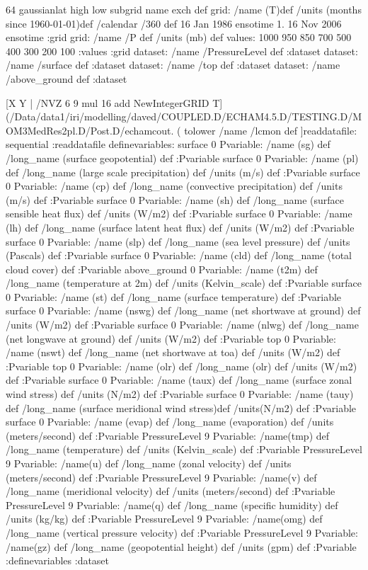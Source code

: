 \begin{ingrid}
64 gaussianlat
    high low subgrid
name exch def
grid:
/name (T)def
/units (months since 1960-01-01)def
/calendar /360 def
16 Jan 1986 ensotime
1.
16 Nov 2006 ensotime
:grid
grid: /name /P def
/units  (mb)  def
values: 1000 950 850 700 500 400 300 200 100
:values
 :grid
dataset:
/name /PressureLevel def
:dataset
dataset:
/name /surface def
:dataset
dataset:
/name /top def
:dataset
dataset:
/name /above_ground def
:dataset

[X
    Y |
    /NVZ 6
      9 mul
      16 add
      NewIntegerGRID
     T] (/Data/data1/iri/modelling/daved/COUPLED.D/ECHAM4.5.D/TESTING.D/MOM3MedRes2pl.D/Post.D/echamcout.%
        (%
        tolower
        /name /lcmon def
        ]readdatafile: sequential :readdatafile
definevariables:
surface 0 Pvariable: /name (sg) def /long_name (surface geopotential) def  :Pvariable
surface 0 Pvariable: /name (pl) def /long_name (large scale precipitation) def /units (m/s) def :Pvariable
surface 0 Pvariable: /name (cp) def /long_name (convective precipitation) def /units (m/s) def :Pvariable
surface 0 Pvariable: /name (sh) def /long_name (surface sensible heat flux) def /units (W/m2) def :Pvariable
surface 0 Pvariable: /name (lh) def /long_name (surface latent heat flux) def /units (W/m2) def :Pvariable
surface 0 Pvariable: /name (slp) def /long_name (sea level pressure) def /units (Pascals) def :Pvariable
surface 0 Pvariable: /name (cld) def /long_name (total cloud cover) def :Pvariable
above_ground 0 Pvariable: /name (t2m) def /long_name (temperature at 2m) def /units (Kelvin_scale) def :Pvariable
surface 0 Pvariable: /name (st) def /long_name (surface temperature) def :Pvariable
surface 0 Pvariable: /name (nswg) def /long_name (net shortwave at ground) def /units (W/m2) def :Pvariable
surface 0 Pvariable: /name (nlwg) def /long_name (net longwave at ground) def /units (W/m2) def :Pvariable
top 0 Pvariable: /name (nswt) def /long_name (net shortwave at toa) def /units (W/m2) def :Pvariable
top 0 Pvariable: /name (olr) def /long_name (olr) def /units (W/m2) def :Pvariable
surface 0 Pvariable: /name (taux) def /long_name (surface zonal wind stress) def /units (N/m2) def :Pvariable
surface 0 Pvariable: /name (tauy) def /long_name (surface meridional wind stress)def /units(N/m2) def :Pvariable
surface 0 Pvariable: /name (evap) def /long_name (evaporation) def /units (meters/second) def :Pvariable
PressureLevel 9 Pvariable: /name(tmp) def /long_name (temperature) def /units (Kelvin_scale) def :Pvariable
PressureLevel 9 Pvariable: /name(u) def /long_name (zonal velocity) def /units (meters/second) def :Pvariable
PressureLevel 9 Pvariable: /name(v) def /long_name (meridional velocity) def /units (meters/second) def :Pvariable
PressureLevel 9 Pvariable: /name(q) def /long_name (specific humidity) def /units (kg/kg) def :Pvariable
PressureLevel 9 Pvariable: /name(omg) def /long_name (vertical pressure velocity) def :Pvariable
PressureLevel 9 Pvariable: /name(gz) def /long_name (geopotential height) def /units (gpm) def :Pvariable
:definevariables
:dataset
\end{ingrid}
